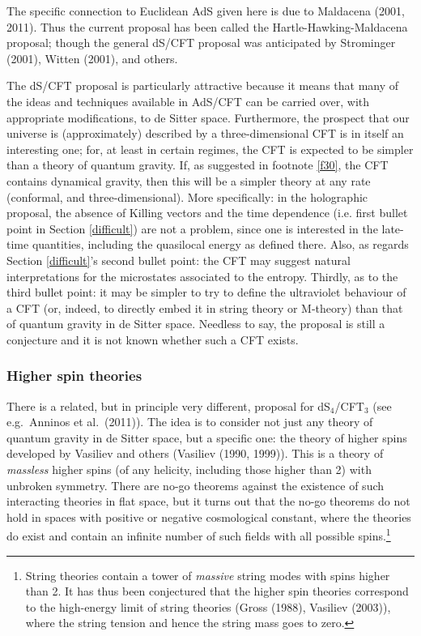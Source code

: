 \documentclass[12pt]{article}
\renewcommand{\^}[1]{\hat{#1}}
\begin{document}
The specific connection to Euclidean AdS given here is due to Maldacena (2001, 2011). Thus the current proposal has been called the Hartle-Hawking-Maldacena proposal; though the general dS/CFT proposal was anticipated by Strominger (2001), Witten (2001), and others. 

The dS/CFT proposal is particularly attractive because it means that many of the ideas and techniques available in AdS/CFT can be carried over, with appropriate modifications, to de Sitter space. Furthermore, the prospect that our universe is (approximately) described by a three-dimensional CFT is in itself an interesting one; for, at least in certain regimes, the CFT is expected to be simpler than a theory of quantum gravity. If, as suggested in footnote \ref{f30}, the CFT contains dynamical gravity, then this will be a simpler theory at any rate (conformal, and three-dimensional). More specifically: in the holographic proposal, the absence of Killing vectors and the time dependence (i.e. first bullet point in Section \ref{difficult}) are not a problem, since one is interested in the late-time quantities, including the quasilocal energy as defined there. Also, as regards Section \ref{difficult}'s second bullet point: the CFT may suggest natural interpretations for the microstates associated to the entropy. Thirdly, as to the third bullet point: it may be simpler to try to define the ultraviolet behaviour of a CFT (or, indeed, to directly embed it in string theory or M-theory) than that of quantum gravity in de Sitter space. Needless to say, the proposal is still a conjecture and it is not known whether such a CFT exists. 

\subsubsection{Higher spin theories}\label{higherspin}

There is a related, but in principle very different, proposal for dS$_4$/CFT$_3$ (see e.g.~Anninos et al.~(2011)). The idea is to consider not  just any theory of quantum gravity in de Sitter space, but a specific one: the theory of higher spins developed by Vasiliev and others (Vasiliev (1990, 1999)). This is a theory of {\it massless} higher spins (of any helicity, including those higher than 2) with unbroken symmetry. There are no-go theorems against the existence of such interacting theories in flat space, but it turns out that the no-go theorems do not hold in spaces with positive or negative cosmological constant, where the theories do exist and contain an infinite number of such fields with all possible spins.\footnote{String theories contain a tower of {\it massive} string modes with spins higher than 2. It has thus been conjectured that the higher spin theories correspond to the high-energy limit of string theories (Gross (1988), Vasiliev (2003)), where the string tension and hence the string mass goes to zero.\label{highe}} 
\end{document}
